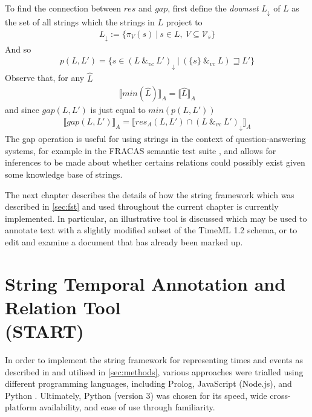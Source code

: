 \documentclass[a4paper,12pt,leqno]{article}
\newcommand{\spvc}{~\&_{v\!c}~}
\newcommand{\V}{\mathcal{V}}
\begin{document}
To find the connection between $res$ and $gap$, first define the \textit{downset} $L_\downarrow$ of $L$ as the set of all strings which the strings in $L$ project to
\begin{align}
	L_\downarrow := \{ \pi_V(s) ~|~ s \in L,~ V \subseteq \V_s \}
\end{align}
And so
\begin{align}
	p(L, L') = \{s \in (L \spvc L')_\downarrow ~|~ (\{s\} \spvc L) \sqsupseteq L'\}
\end{align}
Observe that, for any $\hat{L}$
\begin{align}
	\llbracket min(\hat{L}) \rrbracket_A = \llbracket \hat{L} \rrbracket_A
\end{align}
and since $gap(L, L')$ is just equal to $min(p(L, L'))$
\begin{align}
	\llbracket gap(L, L') \rrbracket_A = \llbracket res_A(L, L') \cap (L \spvc L')_\downarrow \rrbracket_A
\end{align}
The gap operation is useful for using strings in the context of question-answering systems, for example in the FRACAS semantic test suite \citep{cooper1996using}, and allows for inferences to be made about whether certains relations could possibly exist given some knowledge base of strings.

The next chapter describes the details of how the string framework which was described in \cref{sec:fst} and used throughout the current chapter is currently implemented. In particular, an illustrative tool is discussed which may be used to annotate text with a slightly modified subset of the TimeML 1.2 \citep{timeml2005timeml} schema, or to edit and examine a document that has already been marked up.
\newpage
\section[String Temporal Annotation and Relation Tool (START)]{String Temporal Annotation and Relation Tool\\(START)}\label{sec:implementation}
In order to implement the string framework for representing times and events as described in  and utilised in \cref{sec:methods}, various approaches were trialled using different programming languages, including Prolog, JavaScript (Node.js), and Python \citep[see][respectively for more on each]{clocksin2012programming,tilkov2010node,kuhlman2009python}. Ultimately, Python (version 3) was chosen for its speed, wide cross-platform availability, and ease of use through familiarity.
\end{document}
